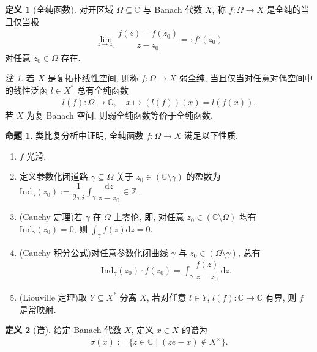 \documentclass{MainStyle}
\theoremstyle{definition}
\theoremstyle{definition}
\theoremstyle{definition}
\newtheorem{definition}{定义}
\theoremstyle{definition}
\newtheorem{proposition}{命题}
\theoremstyle{definition}
\theoremstyle{definition}
\theoremstyle{definition}
\theoremstyle{remark}
\newtheorem{remark}{注}
\theoremstyle{remark}
\begin{document}
\begin{definition}[全纯函数]
    对开区域 $\Omega\subseteq \mathbb C$ 与 Banach 代数 $X$, 称 $f:\Omega\to X$ 是全纯的当且仅当极
    \begin{align*}
        \lim_{z\to z_0}\dfrac{f(z)-f(z_0)}{z-z_0}=:f'(z_0)
    \end{align*}
    对任意 $z_0\in \Omega$ 存在.
\end{definition}

\begin{remark}
    若 $X$ 是复拓扑线性空间, 则称 $f:\Omega\to X$ 弱全纯, 当且仅当对任意对偶空间中的线性泛函 $l\in X^\ast$ 总有全纯函数
    \begin{align*}
        l(f):\Omega \to \mathbb C, \quad x\mapsto (l(f))(x)=l(f(x)).
    \end{align*}
    若 $X$ 为复 Banach 空间, 则弱全纯函数等价于全纯函数.
\end{remark}

\begin{proposition}
    类比复分析中证明, 全纯函数 $f:\Omega\to X$ 满足以下性质.
    \begin{enumerate}
        \item $f$ 光滑.
        \item 定义参数化闭道路 $\gamma\subseteq\Omega$ 关于 $z_0\in (\mathbb C\setminus \gamma)$ 的盈数为 $\displaystyle \mathrm{Ind}_\gamma (z_0):=\dfrac{1}{2\pi i}\int_\gamma\dfrac{\mathrm dz}{z-z_0}\in \mathbb Z$.
        \item (Cauchy 定理)若 $\gamma$ 在 $\Omega$ 上零伦, 即, 对任意 $z_0\in (\mathbb C\setminus\Omega)$ 均有 $\mathrm{Ind}_\gamma(z_0)=0$, 则 $\displaystyle \int_\gamma f(z)\mathrm dz=0$.
        \item (Cauchy 积分公式)对任意参数化闭曲线 $\gamma$ 与 $z_0\in (\Omega\setminus \gamma)$, 总有
              \begin{align*}
                  \mathrm{Ind}_\gamma(z_0)\cdot f(z_0) =\int_\gamma \dfrac{f(z)}{z-z_0}\,\mathrm dz.
              \end{align*}
        \item (Liouville 定理)取 $Y\subseteq X^\ast$ 分离 $X$, 若对任意 $l\in Y$, $l(f):\mathbb C\to \mathbb C$ 有界, 则 $f$ 是常映射.
    \end{enumerate}
\end{proposition}

\begin{definition}[谱]
    给定 Banach 代数 $X$, 定义 $x\in X$ 的谱为
    \begin{align*}
        \sigma(x):=\{z\in \mathbb C\mid (z e-x)\notin X^\times \}.
    \end{align*}
\end{definition}
\end{document}
